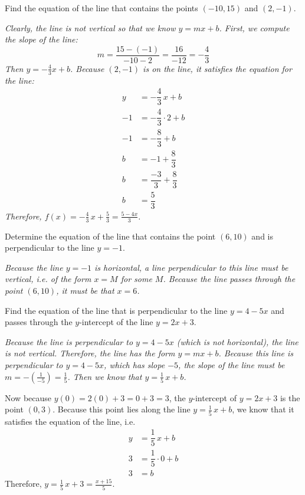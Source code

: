 \documentclass[12pt,letterpaper]{exam}
\begin{document}
\begin{questions}
\newpage



\newpage
\question[6] Find the equation of the line that contains the points $(-10, 15)$ and $(2, -1)$. \pspace

{\itshape Clearly, the line is not vertical so that we know $y= mx + b$. First, we compute the slope of the line: \pspace 
	\[
	m= \dfrac{15 - (-1)}{-10 - 2}= \dfrac{16}{-12}= -\dfrac{4}{3}
	\] \pspace
Then $y= -\frac{4}{3}x + b$. Because $(2, -1)$ is on the line, it satisfies the equation for the line: \pspace
	\[
	\begin{aligned}
	y&= -\dfrac{4}{3}\,x + b \\[0.3cm]
	-1&= -\dfrac{4}{3} \cdot 2 + b \\[0.3cm]
	-1&= -\dfrac{8}{3} + b \\[0.3cm]
	b&= -1 + \dfrac{8}{3} \\[0.3cm]
	b&= \dfrac{-3}{3} + \dfrac{8}{3} \\[0.3cm]
	b&= \dfrac{5}{3}
	\end{aligned}
	\] \pspace
Therefore, $f(x)= -\frac{4}{3}\,x + \frac{5}{3}= \frac{5 - 4x}{3}$.
}



\newpage



\newpage
\question[6] Determine the equation of the line that contains the point $(6, 10)$ and is perpendicular to the line $y= -1$. \pspace 

{\itshape Because the line $y= -1$ is horizontal, a line perpendicular to this line must be vertical, i.e. of the form $x= M$ for some $M$. Because the line passes through the point $(6, 10)$, it must be that $x= 6$.}



\newpage



\newpage
\question[6] Find the equation of the line that is perpendicular to the line $y= 4 - 5x$ and passes through the $y$-intercept of the line $y= 2x + 3$. \pspace

{\itshape Because the line is perpendicular to $y= 4 - 5x$ (which is not horizontal), the line is not vertical. Therefore, the line has the form $y= mx + b$. Because this line is perpendicular to $y= 4 - 5x$, which has slope $-5$, the slope of the line must be $m= -(\frac{1}{-5})= \frac{1}{5}$. Then we know that $y= \frac{1}{5}\,x + b$. \pspace

Now because $y(0)= 2(0) + 3= 0 + 3= 3$, the $y$-intercept of $y= 2x + 3$ is the point $(0, 3)$. Because this point lies along the line $y= \frac{1}{5}\,x + b$, we know that it satisfies the equation of the line, i.e.
	\[
	\begin{aligned}
	y&= \dfrac{1}{5}\,x + b \\[0.3cm]
	3&= \dfrac{1}{5} \cdot 0 + b \\[0.3cm]
	3&= b
	\end{aligned}
	\]
Therefore, $y= \frac{1}{5}\,x + 3= \frac{x + 15}{5}$. 
}




\end{questions}
\end{document}
